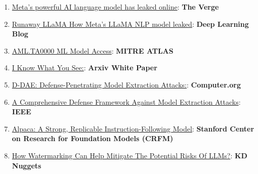 \documentclass[
]{article}
\providecommand{\tightlist}{%
  \setlength{\itemsep}{0pt}\setlength{\parskip}{0pt}}
\begin{document}
\begin{enumerate}
\def\labelenumi{\arabic{enumi}.}
\tightlist
\item
  \href{https://www.theverge.com/2023/3/8/23629362/meta-ai-language-model-llama-leak-online-misuse}{Meta's
  powerful AI language model has leaked online}: \textbf{The Verge}
\item
  \href{https://www.deeplearning.ai/the-batch/how-metas-llama-nlp-model-leaked/}{Runaway
  LLaMA \textbar{} How Meta's LLaMA NLP model leaked}: \textbf{Deep
  Learning Blog}
\item
  \href{https://atlas.mitre.org/tactics/AML.TA0000}{AML.TA0000 ML Model
  Access}: \textbf{MITRE ATLAS}
\item
  \href{https://arxiv.org/pdf/1803.05847.pdf}{I Know What You See:}:
  \textbf{Arxiv White Paper}
\item
  \href{https://www.computer.org/csdl/proceedings-article/sp/2023/933600a432/1He7YbsiH4c}{D-DAE:
  Defense-Penetrating Model Extraction Attacks:}: \textbf{Computer.org}
\item
  \href{https://ieeexplore.ieee.org/document/10080996}{A Comprehensive
  Defense Framework Against Model Extraction Attacks}: \textbf{IEEE}
\item
  \href{https://crfm.stanford.edu/2023/03/13/alpaca.html}{Alpaca: A
  Strong, Replicable Instruction-Following Model}: \textbf{Stanford
  Center on Research for Foundation Models (CRFM)}
\item
  \href{https://www.kdnuggets.com/2023/03/watermarking-help-mitigate-potential-risks-llms.html}{How
  Watermarking Can Help Mitigate The Potential Risks Of LLMs?}:
  \textbf{KD Nuggets}
\end{enumerate}
\end{document}
